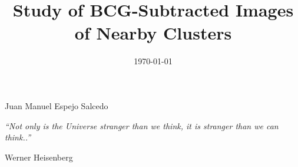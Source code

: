 \documentclass[a4paper, 11pt, oneside]{Thesis}  %
\begin{document}
\frontmatter      %

\title  {Study of BCG-Subtracted Images of Nearby Clusters}
            
\authors  
            {{Juan Manuel Espejo Salcedo}}
            
           
\addresses  {\groupname\\\deptname\\\univname}  %
\date       {\today}
\subject    {}
\keywords   {}

\maketitle


\fancyhead{}  %
\rhead{\thepage}  %
\lhead{}  %

\pagestyle{fancy}  %

\pagestyle{empty}  %

\null\vfill
\textit{``Not only is the Universe stranger than we think, it is stranger than we can think..''}

\begin{flushright}
Werner Heisenberg
\end{flushright}

\vfill\vfill\vfill\vfill\vfill\vfill\null
\clearpage  %
\end{document}
